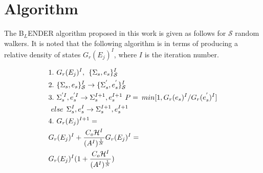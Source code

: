 \documentclass[aps,pre,reprint,superscriptaddress,showkeys]{revtex4-1}
\begin{document}
\section{Algorithm}
\label{sec1}
The B$_{L}$ENDER algorithm proposed in this work  is given as follows for $\mathcal{S}$ random walkers. It is noted that the following algorithm is in terms of producing a relative density of states $G_{r}(E_j)^I$, where $I$ is the iteration number. 

\begin{equation}
\begin{split}
&1.\hspace{0.125cm} G_{r}(E_j)^I ,\hspace{0.15cm}  \{\Sigma_{s},e_s\}_{\mathcal{S}}^I\\
&2. \hspace{0.125cm}\{\Sigma_{s},e_s\}_{\mathcal{S}}^I \rightarrow  \{\Sigma_{s}^{'},e_s^{'}\}_{\mathcal{S}}^I\\
&3. \hspace{0.125cm} \Sigma_{s}^{'I}, e_s^{'I} \rightarrow \Sigma_{s}^{I+1},e_s^{I+1}   \hspace{0.125cm} P = \hspace{0.075cm} min [1, G_r(e_s)^{I}/G_r(e_s^{'})^{I}]\\
& \hspace{0.125cm}else  \hspace{0.15cm} \Sigma_{s}^I, e_s^I \rightarrow \Sigma_{s}^{I+1}, e_s^{I+1}\\
&4. \hspace{0.125cm} G_{r}(E_j)^{I+1} =  \\
& G_{r}(E_j)^{I} + \frac{C_o \mathcal{H}^I }{ (A^{I})^{\frac{1}{N} } }G_{r}(E_j)^{I} = \\
& G_{r}(E_j)^{I}( 1 +  \frac{C_o \mathcal{H}^I }{ (A^{I})^{\frac{1}{N} } } )\\
\end{split}
\label{blender}
\end{equation}
\end{document}
